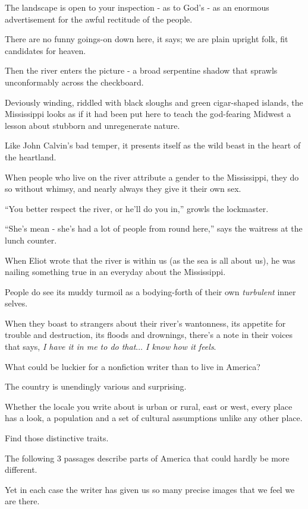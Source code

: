 \documentclass{book}
\numberwithin{equation}{section}
\begin{document}
The landscape is open to your inspection - as to God's - as an enormous advertisement for the awful rectitude of the people.

There are no funny goings-on down here, it says; we are plain upright folk, fit candidates for heaven.

%
Then the river enters the picture - a broad serpentine shadow that sprawls unconformably across the checkboard.

Deviously winding, riddled with black sloughs and green cigar-shaped islands, the Mississippi looks as if it had been put here to teach the god-fearing Midwest a lesson about stubborn and unregenerate nature.

Like John Calvin's bad temper, it presents itself as the wild beast in the heart of the heartland.

%
When people who live on the river attribute a gender to the Mississippi, they do so without whimsy, and nearly always they give it their own sex.

``You better respect the river, or he'll do you in,'' growls the lockmaster.

``She's mean - she's had a lot of people from round here,'' says the waitress at the lunch counter.

When Eliot wrote that the river is within us (as the sea is all about us), he was nailing something true in an everyday about the Mississippi.

People do see its muddy turmoil as a bodying-forth of their own \textit{turbulent} inner selves.

When they boast to strangers about their river's wantonness, its appetite for trouble and destruction, its floods and drownings, there's a note in their voices that says, \textit{I have it in me to do that$\ldots$ I know how it feels}.

%
What could be luckier for a nonfiction writer than to live in America?

The country is unendingly various and surprising.

Whether the locale you write about is urban or rural, east or west, every place has a look, a population and a set of cultural assumptions unlike any other place.

Find those distinctive traits.

The following 3 passages describe parts of America that could hardly be more different.

Yet in each case the writer has given us so many precise images that we feel we are there.
\end{document}
